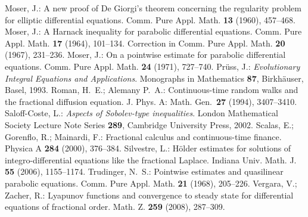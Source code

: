 \documentclass[10pt]{article}
\begin{document}
\begin{thebibliography}{99}
{ Moser, J.: A new proof of De Giorgi's theorem
concerning the regularity problem for elliptic differential
equations. Comm. Pure Appl. Math. {\bf 13} (1960), 457--468.
 Moser, J.: A Harnack inequality for parabolic
differential equations. Comm. Pure Appl. Math. {\bf 17} (1964),
101--134. Correction in Comm. Pure Appl. Math. {\bf 20} (1967),
231--236.
 Moser, J.: On a pointwise estimate for parabolic
differential equations. Comm. Pure Appl. Math. {\bf 24} (1971),
727--740.
 Pr\"uss, J.: {\em Evolutionary Integral Equations and
Applications}. Monographs in Mathematics {\bf 87}, Birkh\"auser,
Basel, 1993.
 Roman, H.\ E.; Alemany P.\ A.: Continuous-time random
walks and the fractional diffusion equation. J. Phys. A: Math. Gen.\
{\bf 27} (1994), 3407--3410.
\bibitem{SalCoste} Saloff-Coste, L.: {\em Aspects of Sobolev-type
inequalities}. London Mathematical Society Lecture Note Series {\bf
289}, Cambridge University Press, 2002.
\bibitem{Sca} Scalas, E.; Gorenflo, R.; Mainardi, F.: Fractional
calculus and continuous-time finance. Physica A {\bf 284} (2000),
376--384.
\bibitem {Silv} Silvestre, L.: H\"older estimates for solutions of
integro-differential equations like the fractional Laplace. Indiana
Univ. Math. J. {\bf 55} (2006), 1155--1174.
\bibitem{Trud} Trudinger, N.\ S.: Pointwise estimates and quasilinear parabolic
equations. Comm. Pure Appl. Math. {\bf 21} (1968), 205--226.
\bibitem{VZ} Vergara, V.; Zacher, R.: Lyapunov functions and
convergence to steady state for differential equations of fractional
order. Math. Z. {\bf 259} (2008), 287--309.
}
\end{thebibliography}
\end{document}
